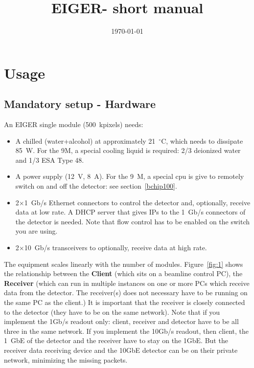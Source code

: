 \documentclass{article}
\newcommand{\E}{EIGER\xspace}
\begin{document}
\title{\E - short manual}
\date{\today}
\maketitle
\tableofcontents

\section{Usage}

\subsection{Mandatory setup - Hardware}
An EIGER single module (500~kpixels) needs:
\begin{itemize}
\item A chilled (water+alcohol) at approximately 21~$^{\circ}$C, which needs to dissipate 85~W. For the 9M, a special cooling liquid is required: 2/3 deionized water and 1/3 ESA Type 48.
\item A power supply (12~V, 8~A). For the 9~M, a special cpu is give to remotely switch on and off the detector: see section~\ref{bchip100}. 
\item 2$\times$1~Gb/s Ethernet connectors to control the detector and, optionally, receive data at low rate. A DHCP server that gives IPs to the 1~Gb/s connectors of the detector is needed. Note that flow control has to be enabled on the switch you are using.
\item 2$\times$10~Gb/s transceivers to optionally, receive data at high rate.
\end{itemize}
The equipment scales linearly with the number of modules.
Figure~\ref{fig:1} shows the relationship between the \textbf{Client} (which sits on a beamline control PC), the \textbf{Receiver} (which can run in multiple instances on one or more PCs which receive data from the detector. The receiver(s) does not necessary have to be running on the same PC as the client.) It is important that the receiver is closely connected to the detector (they have to be on the same network). Note that if you implement the 1Gb/s readout only: client, receiver and detector have to be all three in the same network. If you implement the 10Gb/s readout, then client, the 1~GbE of the detector and the receiver have to stay on the 1GbE. But the receiver data receiving device and the 10GbE detector can be on their private network, minimizing the missing packets.  
\end{document}
